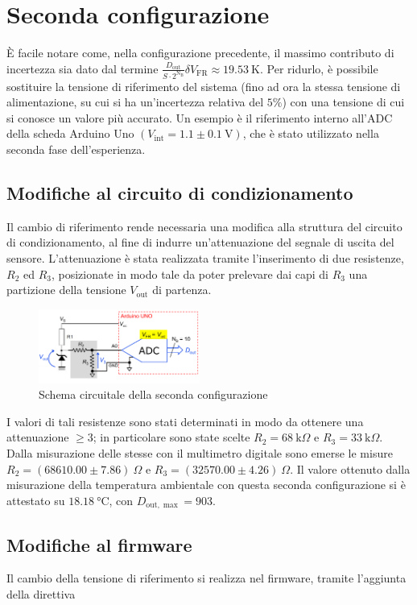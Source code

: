 \documentclass{article}
\begin{document}
\section{Seconda configurazione}
È facile notare come, nella configurazione precedente, il massimo contributo di incertezza sia dato dal termine $\frac{D_{\text{out}}}{S\cdot2^{\text{N}_\text{B}}}\delta V_{\text{FR}}\approx\SI{19.53}{\kelvin}$. Per ridurlo, è
possibile sostituire la tensione di riferimento del sistema (fino ad ora la stessa tensione di alimentazione, su cui si ha un'incertezza relativa del $5\%$) con una tensione di cui si conosce un valore più accurato. Un esempio
è il riferimento interno all'ADC della scheda Arduino Uno $(V_{\text{int}}=1.1\pm\SI{0.1}{\volt})$, che è stato utilizzato nella seconda fase dell'esperienza.
\subsection{Modifiche al circuito di condizionamento}
Il cambio di riferimento rende necessaria una modifica alla struttura del circuito di condizionamento, al fine di indurre un'attenuazione del segnale di uscita del sensore. L'attenuazione è stata realizzata tramite l'inserimento di due resistenze, 
$R_2$ ed $R_3$, posizionate in modo tale da poter prelevare dai capi di $R_3$ una partizione della tensione $V_\text{out}$ di partenza.
\begin{figure}[H]
    \centering\includegraphics[width=200px]{img/circuito_2.png}
    \caption{Schema circuitale della seconda configurazione}
\end{figure}
I valori di tali resistenze sono stati determinati in modo da ottenere una attenuazione $\ge 3$; in particolare sono state scelte 
$R_2 = \SI{68}{\kilo\Omega}$ e $R_3=\SI{33}{\kilo\Omega}$. Dalla misurazione delle stesse con il multimetro digitale sono emerse le misure $R_2=\left(68610.00\pm7.86\right)\SI{}{\Omega}$ e $R_3=\left(32570.00\pm4.26\right)\SI{}{\Omega}$.
Il valore ottenuto dalla misurazione della temperatura ambientale con questa seconda configurazione si è attestato su $\SI{18.18}{\celsius}$, con $D_{\text{out}, \max} = 903$.
\subsection{Modifiche al firmware}
Il cambio della tensione di riferimento si realizza nel firmware, tramite l'aggiunta della direttiva
\end{document}

